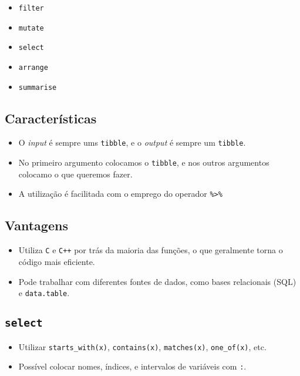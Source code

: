 \documentclass[]{book}
\providecommand{\tightlist}{%
  \setlength{\itemsep}{0pt}\setlength{\parskip}{0pt}}
\begin{document}
\begin{itemize}
\tightlist
\item
  \texttt{filter}
\item
  \texttt{mutate}
\item
  \texttt{select}
\item
  \texttt{arrange}
\item
  \texttt{summarise}
\end{itemize}

\subsection{Características}\label{caracteristicas}

\begin{itemize}
\tightlist
\item
  O \emph{input} é sempre ums \texttt{tibble}, e o \emph{output} é
  sempre um \texttt{tibble}.
\item
  No primeiro argumento colocamos o \texttt{tibble}, e nos outros
  argumentos colocamo o que queremos fazer.
\item
  A utilização é facilitada com o emprego do operador
  \texttt{\%\textgreater{}\%}
\end{itemize}

\subsection{Vantagens}\label{vantagens}

\begin{itemize}
\tightlist
\item
  Utiliza \texttt{C} e \texttt{C++} por trás da maioria das funções, o
  que geralmente torna o código mais eficiente.
\item
  Pode trabalhar com diferentes fontes de dados, como bases relacionais
  (SQL) e \texttt{data.table}.
\end{itemize}

\subsection{\texorpdfstring{\texttt{select}}{select}}\label{select}

\begin{itemize}
\tightlist
\item
  Utilizar \texttt{starts\_with(x)}, \texttt{contains(x)},
  \texttt{matches(x)}, \texttt{one\_of(x)}, etc.
\item
  Possível colocar nomes, índices, e intervalos de variáveis com
  \texttt{:}.
\end{itemize}
\end{document}
